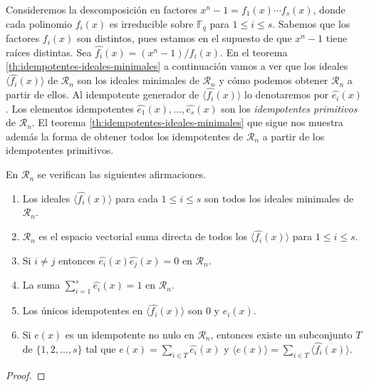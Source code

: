 Consideremos la descomposición en factores \(x^n - 1 = f_1(x)\cdots f_s(x)\), donde cada polinomio \(f_i(x)\) es irreducible sobre \(\mathbb F_q\) para \(1 \leq i \leq s\).
Sabemos que los factores \(f_i(x)\) son distintos, pues estamos en el supuesto de que \(x^n - 1\) tiene raíces distintas.
Sea \(\widehat{f_i}(x) = (x^n - 1)/f_i(x)\).
En el teorema \ref{th:idempotentes-ideales-minimales} a continuación vamos a ver que los ideales \(\langle \widehat{f_i}(x)\rangle\) de \(\mathcal R_n\) son los ideales minimales de \(\mathcal R_n\) y cómo podemos obtener \(\mathcal R_n\) a partir de ellos.
Al idempotente generador de \(\langle \widehat{f_i}(x)\rangle\) lo denotaremos por \(\widehat{e_i}(x)\).
Los elementos idempotentes \(\widehat{e_1}(x), \dots, \widehat{e_s}(x)\) son los \emph{idempotentes primitivos} de \(\mathcal R_n\).
El teorema \ref{th:idempotentes-ideales-minimales} que sigue nos muestra además la forma de obtener todos los idempotentes de \(\mathcal R_n\) a partir de los idempotentes primitivos.

\begin{theorem}
  \label{th:idempotentes-ideales-minimales}
  En \(\mathcal R_n\) se verifican las siguientes afirmaciones.
  \begin{enumerate}
    \item Los ideales \(\langle \widehat{f_i}(x)\rangle\) para cada \(1 \leq i \leq s\) son todos los ideales minimales de \(\mathcal R_n\).
    \item \(\mathcal R_n\) es el espacio vectorial suma directa de todos los \(\langle \widehat{f_i}(x)\rangle\) para \(1 \leq i \leq s\).
    \item Si \(i \neq j\) entonces \(\widehat{e_i}(x)\widehat{e_j}(x) = 0\) en \(\mathcal R_n\).
    \item La suma \(\sum_{i=1}^s \widehat{e_i}(x) = 1\) en \(\mathcal R_n\).
    \item Los únicos idempotentes en \(\langle \widehat{f_i}(x)\rangle\) son \(0\) y \(\widehat{e_i}(x)\).
    \item Si \(e(x)\) es un idempotente no nulo en \(\mathcal R_n\), entonces existe un subconjunto \(T\) de \(\{1, 2, \dots, s\}\) tal que \(e(x) = \sum_{i \in T}\widehat{e_i}(x)\) y \(\langle e(x) \rangle = \sum_{i \in T}\langle \widehat{f_i}(x)\rangle\).
  \end{enumerate}
\end{theorem}

\begin{proof}
  
\end{proof}

